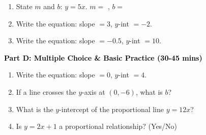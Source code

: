 \documentclass[12pt, letterpaper, fleqn]{article}
\newcommand{\blank}{\underline{\hspace{2.2cm}}}
\begin{document}
\begin{enumerate}[itemsep=2.5cm, leftmargin=0.6cm, resume]
\item State $m$ and $b$: $y = 5x$. $m=$ \blank, $b=$ \blank
\item Write the equation: slope $= 3$, $y$-int $= -2$. \blank
\item Write the equation: slope $= -0.5$, $y$-int $= 10$. \blank
\end{enumerate}

\newpage

\begin{tcolorbox}[colback=customteal!20]
\large\textcolor{black}{\textbf{Part D: Multiple Choice \& Basic Practice (30-45 mins)}}
\end{tcolorbox}

\vspace{3mm}

\begin{enumerate}[itemsep=2.5cm, leftmargin=0.6cm, resume]
\item Write the equation: slope $= 0$, $y$-int $= 4$. \blank
\item If a line crosses the $y$-axis at $(0, -6)$, what is $b$? \blank
\item What is the $y$-intercept of the proportional line $y = 12x$? \blank
\item Is $y = 2x + 1$ a proportional relationship? (Yes/No) \blank
\end{enumerate}
\end{document}
